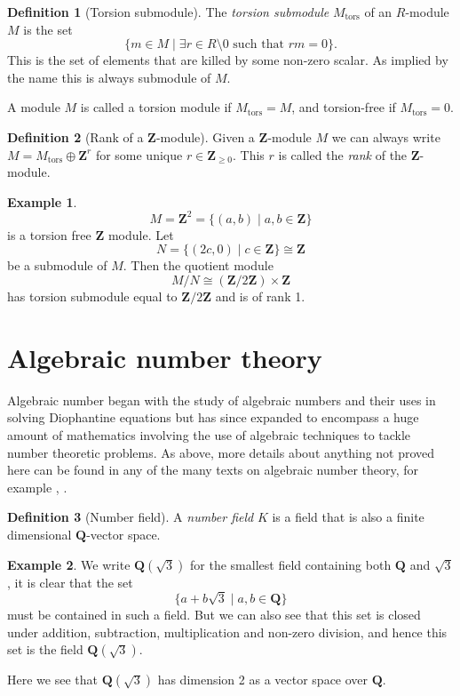 \documentclass[a4paper,abstracton,bibtotoc]{scrreprt}
\theoremstyle{definition}
\newtheorem{defn}{Definition}
\newtheorem{ex}{Example}
\newcommand{\QQ}{\mathbf{Q}}
\newcommand{\ZZ}{\mathbf{Z}}
\begin{document}
\begin{defn}[Torsion submodule]
The \emph{torsion submodule} $M_\text{tors}$ of an $R$-module $M$ is the set
\[
\{m\in M \mid \exists r \in R\setminus 0 \text{ such that } rm = 0\}.
\]
This is the set of elements that are killed by some non-zero scalar.
As implied by the name this is always submodule of $M$.
\end{defn}

A module $M$ is called a torsion module if $M_\text{tors} = M$, and torsion-free if $M_\text{tors} = 0$.


\begin{defn}[Rank of a $\ZZ$-module]
Given a $\ZZ$-module $M$ we can always write $M = M_\text{tors} \oplus \ZZ^r$ for some unique $r\in \ZZ_{\ge 0}$.
This $r$ is called the \emph{rank} of the $\ZZ$-module.
\end{defn}

\begin{ex}
\[M = \ZZ^2 = \{(a,b)\mid a,b\in \ZZ\}\]
is a torsion free $\ZZ$ module. Let
\[N = \{(2c,0) \mid c\in\ZZ\} \cong \ZZ\]
be a submodule of $M$.
Then the quotient module
\[M/N \cong (\ZZ/2\ZZ)\times \ZZ\]
has torsion submodule equal to $\ZZ/2\ZZ$ and is of rank 1.
\end{ex}

\section{Algebraic number theory}

Algebraic number began with the study of algebraic numbers and their uses in solving Diophantine equations but has since expanded to encompass a huge amount of mathematics involving the use of algebraic techniques to tackle number theoretic problems. %
As above, more details about anything not proved here can be found in any of the many texts on algebraic number theory, for example \cite{neukirch}, \cite{lang}.

\begin{defn}[Number field]
A \emph{number field} $K$ is a field that is also a finite dimensional $\QQ$-vector space.
\end{defn}

\begin{ex}\label{ex:quad}
We write $\QQ(\sqrt{3})$ for the smallest field containing both $\QQ$ and $\sqrt{3}$, it is clear that the set
\[
\{a + b\sqrt{3}\mid a,b \in \QQ\}
\]
must be contained in such a field.
But we can also see that this set is closed under addition, subtraction, multiplication and non-zero division, and hence this set is the field $\QQ(\sqrt{3})$.

Here we see that $\QQ(\sqrt{3})$ has dimension 2 as a vector space over $\QQ$.
\end{ex}
\end{document}
